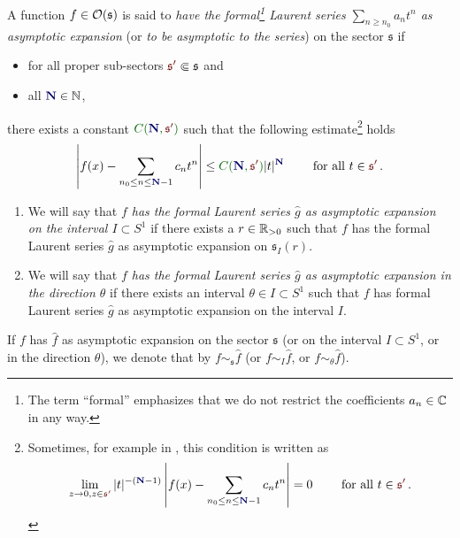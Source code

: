 \begin{defn}
  \def\myN{\textbf{\textcolor{blue!40!black}{N}}}
  \def\mySect{\textcolor{red!40!black}{\mathfrak{s}'}}
  \def\myConst{\textcolor{green!40!black}{C(\myN,\mySect)}}
  A function $f\in\mathcal{O}(\mathfrak{s})$ is said to \emph{have the
  formal\footnote{The term ``formal'' emphasizes that we do not restrict the
  coefficients $a_n\in\mathbb{C}$ in any way.} Laurent series $\sum_{n\geq n_0}a_nt^n$
  as asymptotic expansion} (or \emph{to be asymptotic to the series}) on the
  sector $\mathfrak{s}$  if
  \begin{itemize}
    \item for all proper sub-sectors $\mySect\Subset\mathfrak{s}$ and
    \item all $\myN\in\N$,
  \end{itemize}
  there exists a constant
  $\myConst$ such that the following estimate\footnote{Sometimes, for example
    in \cite{sabbah_cimpa90}, this condition is written as
    \[
      \lim_{z\to0,z\in{\mySect}}
      |t|^{-(\myN-1)}
      \left|
        f(x)-\sum_{n_0\leq n\leq \myN-1}c_nt^n
      \right|=0
      \qquad \text{ for all } t\in \mySect \,.
    \]} holds
  \[
    \left|
      f(x)-\sum_{n_0\leq n\leq \myN-1}c_nt^n
    \right|
    \leq \myConst|t|^{\myN} \qquad \text{ for all }t\in \mySect \,.
  \]
  \begin{enumerate}
    \item We will say that \emph{$f$ has the formal Laurent series $\hat g$ as
      asymptotic expansion on the interval $I\subset S^1$} if there exists a
      $r\in\mathbb{R}_{>0}$ such that $f$ has the formal Laurent series $\hat g$ as
      asymptotic expansion on $\mathfrak{s}_I(r)$.
    \item We will say that \emph{$f$ has the formal Laurent series $\hat g$ as
      asymptotic expansion in the direction $\theta$} if there exists an
      interval $\theta\in I\subset S^1$ such that $f$ has formal Laurent series
      $\hat g$ as asymptotic expansion on the interval $I$.
  \end{enumerate}
\end{defn}
If $f$ has $\hat f$ as asymptotic expansion on the sector $\mathfrak{s}$ (or on
the interval $I\subset S^1$, or in the direction $\theta$), we denote that by
$f\sim_{\mathfrak{s}}\hat f$ (or $f\sim_{I}\hat f$, or
$f\sim_{\theta}\hat f$).\label{page:notationForAsymptoticExpansion}

